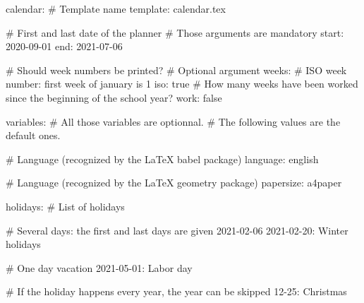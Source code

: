 calendar:
  # Template name
  template: calendar.tex

  # First and last date of the planner
  # Those arguments are mandatory
  start: 2020-09-01
  end: 2021-07-06

  # Should week numbers be printed?
  # Optional argument
  weeks:
    # ISO week number: first week of january is 1
    iso: true
    # How many weeks have been worked since the beginning of the school year?
    work: false

variables:
  # All those variables are optionnal.
  # The following values are the default ones.

  # Language (recognized by the LaTeX babel package)
  language: english

  # Language (recognized by the LaTeX geometry package)
  papersize: a4paper

holidays:
  # List of holidays

  # Several days: the first and last days are given
  2021-02-06 2021-02-20: Winter holidays

  # One day vacation
  2021-05-01: Labor day

  # If the holiday happens every year, the year can be skipped
  12-25: Christmas
